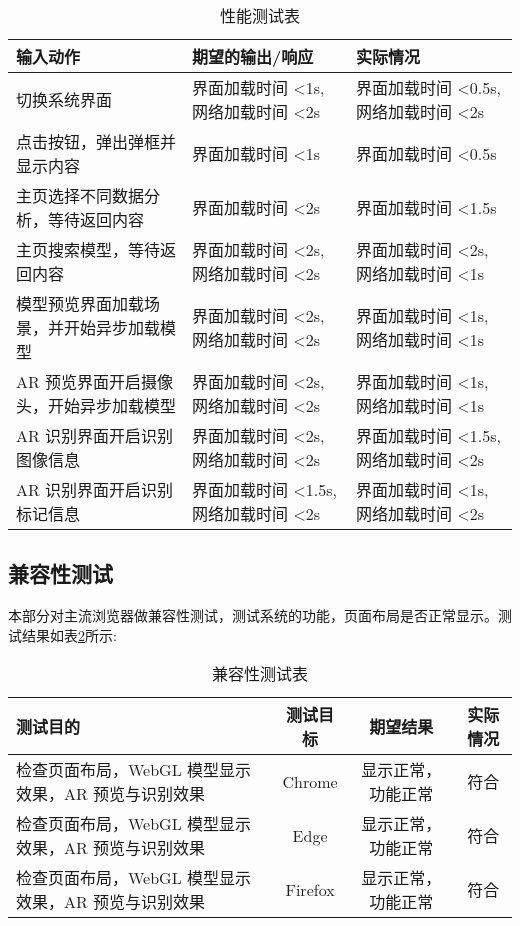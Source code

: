 \begin{table}[H]
  \centering
  \small
  \renewcommand\arraystretch{1.1}
  \caption{性能测试表}
  \label{table:性能测试表}
  \setlength{\tabcolsep}{4mm}
  \begin{tabular}{|p{4.5cm}|p{4cm}|p{4cm}|}
    \hline \textbf{输入动作} & \textbf{期望的输出/响应} & \textbf{实际情况} \\
    \hline 切换系统界面 & 界面加载时间 <1s, 网络加载时间 <2s & 界面加载时间 <0.5s, 网络加载时间 <2s  \\
    \hline 点击按钮，弹出弹框并显示内容 & 界面加载时间 <1s & 界面加载时间 <0.5s  \\
    \hline 主页选择不同数据分析，等待返回内容 & 界面加载时间 <2s & 界面加载时间 <1.5s  \\
    \hline 主页搜索模型，等待返回内容 & 界面加载时间 <2s, 网络加载时间 <2s & 界面加载时间 <2s, 网络加载时间 <1s  \\
    \hline 模型预览界面加载场景，并开始异步加载模型 & 界面加载时间 <2s, 网络加载时间 <2s & 界面加载时间 <1s, 网络加载时间 <1s  \\
    \hline AR 预览界面开启摄像头，开始异步加载模型 & 界面加载时间 <2s, 网络加载时间 <2s & 界面加载时间 <1s, 网络加载时间 <1s  \\
    \hline AR 识别界面开启识别图像信息 & 界面加载时间 <2s, 网络加载时间 <2s & 界面加载时间 <1.5s, 网络加载时间 <2s  \\
    \hline AR 识别界面开启识别标记信息 & 界面加载时间 <1.5s, 网络加载时间 <2s & 界面加载时间 <1s, 网络加载时间 <2s  \\
    \hline
  \end{tabular}
\end{table}

\subsection{兼容性测试}

本部分对主流浏览器做兼容性测试，测试系统的功能，页面布局是否正常显示。测试结果如表\ref{table:兼容性测试表}所示:

\begin{table}[H]
  \centering
  \small
  \renewcommand\arraystretch{1.1}
  \caption{兼容性测试表}
  \label{table:兼容性测试表}
  \setlength{\tabcolsep}{4mm}
  \begin{tabular}{|p{6.5cm}|c|c|c|}
    \hline \textbf{测试目的} & \textbf{测试目标} & \textbf{期望结果} & \textbf{实际情况} \\
    \hline 检查页面布局，WebGL 模型显示效果，AR 预览与识别效果 & Chrome & 显示正常，功能正常 & 符合  \\
    \hline 检查页面布局，WebGL 模型显示效果，AR 预览与识别效果 & Edge & 显示正常，功能正常 & 符合  \\
    \hline 检查页面布局，WebGL 模型显示效果，AR 预览与识别效果 & Firefox & 显示正常，功能正常 & 符合  \\
    \hline
  \end{tabular}
\end{table}